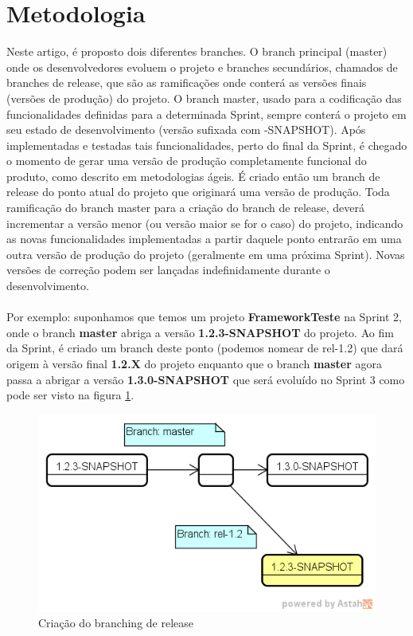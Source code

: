 \section{Metodologia}
\label{sec:metodologia}
Neste artigo, é proposto dois diferentes branches. O branch principal (master) onde os desenvolvedores evoluem o projeto e branches secundários, chamados de branches de release, que são as ramificações onde conterá as versões finais (versões de produção) do projeto.
O branch master, usado para a codificação das funcionalidades definidas para a determinada Sprint, sempre conterá o projeto em seu estado de desenvolvimento (versão sufixada com -SNAPSHOT). Após implementadas e testadas tais funcionalidades, perto do final da Sprint, é chegado o momento de gerar uma versão de produção completamente funcional do produto, como descrito em metodologias ágeis. É criado então um branch de release do ponto atual do projeto que originará uma versão de produção. Toda ramificação do branch master para a criação do branch de release, deverá incrementar a versão menor (ou versão maior se for o caso) do projeto, indicando as novas funcionalidades implementadas a partir daquele ponto entrarão em uma outra versão de produção do projeto (geralmente em uma próxima Sprint). Novas versões de correção podem ser lançadas indefinidamente durante o desenvolvimento.
\\\\
Por exemplo: suponhamos que temos um projeto \textbf{FrameworkTeste} na Sprint 2, onde o branch \textbf{master} abriga a versão \textbf{1.2.3-SNAPSHOT} do projeto. Ao fim da Sprint, é criado um branch deste ponto (podemos nomear de rel-1.2) que dará origem à versão final \textbf{1.2.X} do projeto enquanto que o branch \textbf{master} agora passa a abrigar a versão \textbf{1.3.0-SNAPSHOT} que será evoluído no Sprint 3 como pode ser visto na figura \ref{fig:branchingrelease}.

\begin{figure}[h!]
	\centering
	\includegraphics[width=0.7\linewidth]{img/branching_otojr_01}
	\caption[Branching de Release]{Criação do branching de release}
	\label{fig:branchingrelease}
\end{figure}

